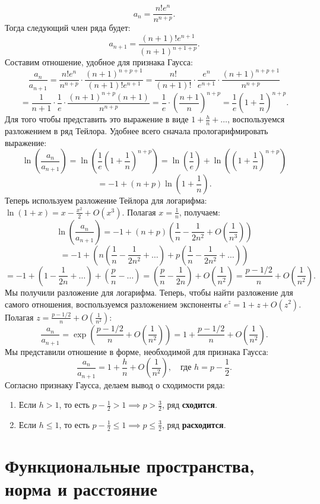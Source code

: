 \documentclass[a4paper, 12pt]{report}
\numberwithin{equation}{section}
\begin{document}
	$$ a_n = \frac{n! e^n}{n^{n+p}}. $$
	Тогда следующий член ряда будет:
	$$ a_{n+1} = \frac{(n+1)! e^{n+1}}{(n+1)^{n+1+p}}. $$
	Составим отношение, удобное для признака Гаусса:
	$$ \frac{a_n}{a_{n+1}} = \frac{n! e^n}{n^{n+p}} \cdot \frac{(n+1)^{n+p+1}}{(n+1)! e^{n+1}} = \frac{n!}{(n+1)!} \cdot \frac{e^n}{e^{n+1}} \cdot \frac{(n+1)^{n+p+1}}{n^{n+p}} $$
	$$ = \frac{1}{n+1} \cdot \frac{1}{e} \cdot \frac{(n+1)^{n+p} (n+1)}{n^{n+p}} = \frac{1}{e} \cdot \left(\frac{n+1}{n}\right)^{n+p} = \frac{1}{e} \left(1 + \frac{1}{n}\right)^{n+p}. $$
	Для того чтобы представить это выражение в виде $1 + \frac{h}{n} + \ldots$, воспользуемся разложением в ряд Тейлора. Удобнее всего сначала прологарифмировать выражение:
	$$ \ln\left(\frac{a_n}{a_{n+1}}\right) = \ln\left(\frac{1}{e} \left(1 + \frac{1}{n}\right)^{n+p}\right) = \ln\left(\frac{1}{e}\right) + \ln\left(\left(1 + \frac{1}{n}\right)^{n+p}\right) $$
	$$ = -1 + (n+p) \ln\left(1 + \frac{1}{n}\right). $$
	Теперь используем разложение Тейлора для логарифма: $\ln(1+x) = x - \frac{x^2}{2} + O(x^3)$. Полагая $x = \frac{1}{n}$, получаем:
	$$ \ln\left(\frac{a_n}{a_{n+1}}\right) = -1 + (n+p)\left(\frac{1}{n} - \frac{1}{2n^2} + O\left(\frac{1}{n^3}\right)\right) $$
	$$ = -1 + \left(n\left(\frac{1}{n} - \frac{1}{2n^2} + \ldots\right) + p\left(\frac{1}{n} - \frac{1}{2n^2} + \ldots\right)\right) $$
	$$ = -1 + \left(1 - \frac{1}{2n} + \ldots\right) + \left(\frac{p}{n} - \ldots\right) = \left(\frac{p}{n} - \frac{1}{2n}\right) + O\left(\frac{1}{n^2}\right) = \frac{p - 1/2}{n} + O\left(\frac{1}{n^2}\right). $$
	Мы получили разложение для логарифма. Теперь, чтобы найти разложение для самого отношения, воспользуемся разложением экспоненты $e^z = 1 + z + O(z^2)$. Полагая $z = \frac{p - 1/2}{n} + O\left(\frac{1}{n^2}\right)$:
	$$ \frac{a_n}{a_{n+1}} = \exp\left(\frac{p - 1/2}{n} + O\left(\frac{1}{n^2}\right)\right) = 1 + \frac{p - 1/2}{n} + O\left(\frac{1}{n^2}\right). $$
	Мы представили отношение в форме, необходимой для признака Гаусса:
	$$ \frac{a_n}{a_{n+1}} = 1 + \frac{h}{n} + O\left(\frac{1}{n^2}\right), \quad \text{где } h = p - \frac{1}{2}. $$
	Согласно признаку Гаусса, делаем вывод о сходимости ряда:
	\begin{enumerate}
		\item Если $h > 1$, то есть $p - \frac{1}{2} > 1 \implies p > \frac{3}{2}$, ряд \textbf{сходится}.
		\item Если $h \le 1$, то есть $p - \frac{1}{2} \le 1 \implies p \le \frac{3}{2}$, ряд \textbf{расходится}.
	\end{enumerate}
	\newpage
	\section{Функциональные пространства, норма и расстояние}
	
\end{document}
